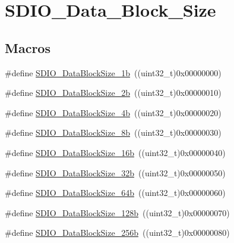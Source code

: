 \hypertarget{group___s_d_i_o___data___block___size}{}\section{S\+D\+I\+O\+\_\+\+Data\+\_\+\+Block\+\_\+\+Size}
\label{group___s_d_i_o___data___block___size}
\subsection*{Macros}
\begin{DoxyCompactItemize}
\item 
\#define \mbox{\hyperlink{group___s_d_i_o___data___block___size_gaa86e90ddc3426b242a5230b3360c620d}{S\+D\+I\+O\+\_\+\+Data\+Block\+Size\+\_\+1b}}~((uint32\+\_\+t)0x00000000)
\item 
\#define \mbox{\hyperlink{group___s_d_i_o___data___block___size_ga7209d9d52635b66df85712c6fcd668ea}{S\+D\+I\+O\+\_\+\+Data\+Block\+Size\+\_\+2b}}~((uint32\+\_\+t)0x00000010)
\item 
\#define \mbox{\hyperlink{group___s_d_i_o___data___block___size_ga59cbaecfdebd63177d1208c268626f0a}{S\+D\+I\+O\+\_\+\+Data\+Block\+Size\+\_\+4b}}~((uint32\+\_\+t)0x00000020)
\item 
\#define \mbox{\hyperlink{group___s_d_i_o___data___block___size_ga14f91159c8c4faf49a335ed9b6a94d0b}{S\+D\+I\+O\+\_\+\+Data\+Block\+Size\+\_\+8b}}~((uint32\+\_\+t)0x00000030)
\item 
\#define \mbox{\hyperlink{group___s_d_i_o___data___block___size_ga52a7bdab9a75edd94d9c1152e8b078e2}{S\+D\+I\+O\+\_\+\+Data\+Block\+Size\+\_\+16b}}~((uint32\+\_\+t)0x00000040)
\item 
\#define \mbox{\hyperlink{group___s_d_i_o___data___block___size_gad0f89aa989c0cedf8d69eb28548413ca}{S\+D\+I\+O\+\_\+\+Data\+Block\+Size\+\_\+32b}}~((uint32\+\_\+t)0x00000050)
\item 
\#define \mbox{\hyperlink{group___s_d_i_o___data___block___size_ga981c219228ae8df11a501e15843338d4}{S\+D\+I\+O\+\_\+\+Data\+Block\+Size\+\_\+64b}}~((uint32\+\_\+t)0x00000060)
\item 
\#define \mbox{\hyperlink{group___s_d_i_o___data___block___size_gaba545c3a5e0f3296341d89a647cb9751}{S\+D\+I\+O\+\_\+\+Data\+Block\+Size\+\_\+128b}}~((uint32\+\_\+t)0x00000070)
\item 
\#define \mbox{\hyperlink{group___s_d_i_o___data___block___size_gaa099d7706f98a4fa6eb88277dc6680cf}{S\+D\+I\+O\+\_\+\+Data\+Block\+Size\+\_\+256b}}~((uint32\+\_\+t)0x00000080)

\end{DoxyCompactItemize}
